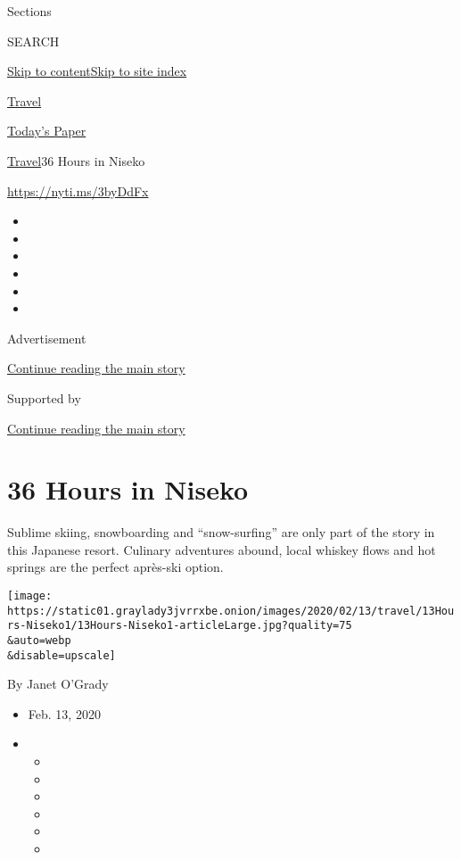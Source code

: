 Sections

SEARCH

\protect\hyperlink{site-content}{Skip to
content}\protect\hyperlink{site-index}{Skip to site index}

\href{https://www.nytimes3xbfgragh.onion/section/travel}{Travel}

\href{https://myaccount.nytimes3xbfgragh.onion/auth/login?response_type=cookie\&client_id=vi}{}

\href{https://www.nytimes3xbfgragh.onion/section/todayspaper}{Today's
Paper}

\href{/section/travel}{Travel}\textbar{}36 Hours in Niseko

\url{https://nyti.ms/3byDdFx}

\begin{itemize}
\item
\item
\item
\item
\item
\item
\end{itemize}

Advertisement

\protect\hyperlink{after-top}{Continue reading the main story}

Supported by

\protect\hyperlink{after-sponsor}{Continue reading the main story}

\hypertarget{36-hours-in-niseko}{%
\section{36 Hours in Niseko}\label{36-hours-in-niseko}}

Sublime skiing, snowboarding and ``snow-surfing'' are only part of the
story in this Japanese resort. Culinary adventures abound, local whiskey
flows and hot springs are the perfect après-ski option.

\texttt{[image: https://static01.graylady3jvrrxbe.onion/images/2020/02/13/travel/13Hours-Niseko1/13Hours-Niseko1-articleLarge.jpg?quality=75\\\&auto=webp\\\&disable=upscale]}

By Janet O'Grady

\begin{itemize}
\item
  Feb. 13, 2020
\item
  \begin{itemize}
  \item
  \item
  \item
  \item
  \item
  \item
  \end{itemize}
\end{itemize}

